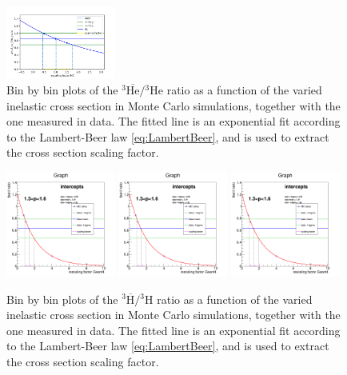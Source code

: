 \begin{figure}
    \includegraphics[width=0.32\textwidth]{figures/he3_rescaling/Bin_7_scaling.png}
    \caption{Bin by bin plots of the $^3\overline{\mathrm{He}}/{^3\mathrm{He}}$ ratio as a function of the varied inelastic cross section in Monte Carlo simulations, together with the one measured in data. The fitted line is an exponential fit according to the Lambert-Beer law \ref{eq:LambertBeer}, and is used to extract the cross section scaling factor.}
    \label{fig:Meth:RatiosAsFunctionsOfSigmaInel3He}
\end{figure}

\begin{figure}
    \centering
    \includegraphics[width=0.32\textwidth]{figures/triton/tbar_Fit_Bin1.png}
    \includegraphics[width=0.32\textwidth]{figures/triton/tbar_Fit_Bin1.png}
    \includegraphics[width=0.32\textwidth]{figures/triton/tbar_Fit_Bin1.png}
    \caption{Bin by bin plots of the $^3\overline{\mathrm{H}}/{^3\mathrm{H}}$ ratio as a function of the varied inelastic cross section in Monte Carlo simulations, together with the one measured in data. The fitted line is an exponential fit according to the Lambert-Beer law \ref{eq:LambertBeer}, and is used to extract the cross section scaling factor.}
    \label{fig:Meth:RatiosAsFunctionsOfSigmaInel3H}
\end{figure}


